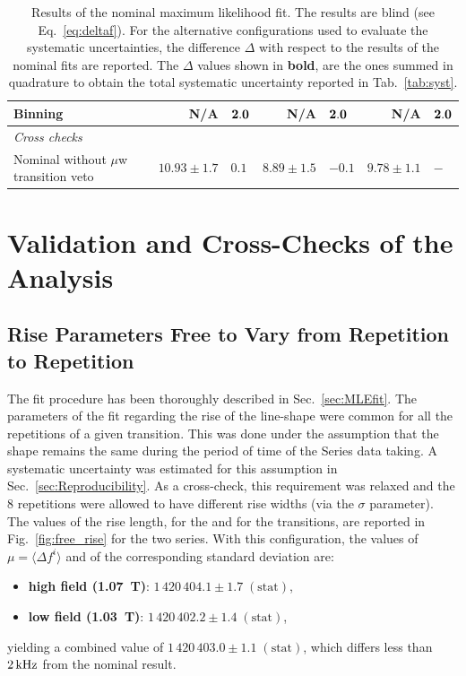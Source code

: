 \begin{table}[!h]
{\begin{tabular}{l||r|l||r|l||r|l}
Binning                                    & N/A & ${\bf 2.0}$ & N/A   & ${\bf 2.0 }	$ & N/A  &  ${\bf 2.0 }$\\
\hline
\hline 
{\it Cross checks} & & & & & & \\
Nominal without $\mu$w transition veto	   & $10.93 \pm 1.7 $  & $ 0.1 $    & $8.89 \pm 1.5 $  & $ -0.1 $ & $ 9.78 \pm 1.1$  & $ - $\\
\hline
\hline
\end{tabular}
}
\caption{Results of the nominal maximum likelihood fit. The results are blind (see Eq.~\ref{eq:deltaf}). For the alternative configurations used to evaluate the systematic uncertainties, the difference $\Delta$ with respect to the results of the nominal fits are reported. The $\Delta$ values shown in {\bf bold}, are the ones summed in quadrature to obtain the total systematic uncertainty reported in Tab.~\ref{tab:syst}.
\label{tab:results}}								
\end{table}

\section{Validation and Cross-Checks of the Analysis} \label{checks}

\subsection{Rise Parameters Free to Vary from Repetition to Repetition}

The fit procedure has been thoroughly described in Sec.~\ref{sec:MLEfit}. The parameters of the fit regarding the rise of the line-shape were common for all the repetitions of a given transition. This was done under the assumption that the shape remains the same during the period of time of the Series data taking. A systematic uncertainty was estimated for this assumption in Sec.~\ref{sec:Reproducibility}. As a cross-check, this requirement was relaxed and the 8 repetitions were allowed to have different rise widths (via the $\sigma$ parameter). The values of the rise length, for the \cb and for the \da transitions, are reported in Fig.~\ref{fig:free_rise} for the two series. With this configuration, the values of $\mu = \langle\Delta f^i \rangle$ and of the corresponding standard deviation are:
\begin{itemize}
    \item \textbf{high field (\SI{1.07}{\tesla})}: $ 1\,420\,404.1 \pm 1.7 \; {\mathrm{(stat)}}$,
    \item \textbf{low field (\SI{1.03}{\tesla})}: $ 1\,420\,402.2 \pm 1.4 \; {\mathrm{(stat)}}$,
\end{itemize}
yielding a combined value of $1\,420\,403.0 \pm 1.1 \; {\mathrm{(stat)}}$, which differs less than $2\,{\rm kHz}$ from the nominal result. 

